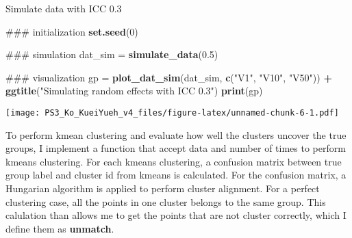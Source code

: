 \documentclass[]{article}
\newenvironment{Shaded}{\begin{snugshade}}{\end{snugshade}}
\newcommand{\KeywordTok}[1]{\textcolor[rgb]{0.13,0.29,0.53}{\textbf{#1}}}
\newcommand{\DecValTok}[1]{\textcolor[rgb]{0.00,0.00,0.81}{#1}}
\newcommand{\FloatTok}[1]{\textcolor[rgb]{0.00,0.00,0.81}{#1}}
\newcommand{\StringTok}[1]{\textcolor[rgb]{0.31,0.60,0.02}{#1}}
\newcommand{\OperatorTok}[1]{\textcolor[rgb]{0.81,0.36,0.00}{\textbf{#1}}}
\newcommand{\NormalTok}[1]{#1}
\begin{document}
Simulate data with ICC 0.3

\begin{Shaded}
\begin{Highlighting}[]
\NormalTok{### initialization}
\KeywordTok{set.seed}\NormalTok{(}\DecValTok{0}\NormalTok{)}

\NormalTok{### simulation}
\NormalTok{dat_sim =}\StringTok{ }\KeywordTok{simulate_data}\NormalTok{(}\FloatTok{0.5}\NormalTok{)}

\NormalTok{### visualization}
\NormalTok{gp =}\StringTok{ }\KeywordTok{plot_dat_sim}\NormalTok{(dat_sim, }\KeywordTok{c}\NormalTok{(}\StringTok{"V1"}\NormalTok{, }\StringTok{"V10"}\NormalTok{, }\StringTok{"V50"}\NormalTok{)) }\OperatorTok{+}
\StringTok{    }\KeywordTok{ggtitle}\NormalTok{(}\StringTok{"Simulating random effects with ICC 0.3"}\NormalTok{)}
\KeywordTok{print}\NormalTok{(gp)}
\end{Highlighting}
\end{Shaded}

\texttt{[image: PS3\_Ko\_KueiYueh\_v4\_files/figure-latex/unnamed-chunk-6-1.pdf]}

To perform kmean clustering and evaluate how well the clusters uncover
the true groups, I implement a function that accept data and number of
times to perform kmeans clustering. For each kmeans clustering, a
confusion matrix between true group label and cluster id from kmeans is
calculated. For the confusion matrix, a Hungarian algorithm is applied
to perform cluster alignment. For a perfect clustering case, all the
points in one cluster belongs to the same group. This calulation than
allows me to get the points that are not cluster correctly, which I
define them as \textbf{unmatch}.
\end{document}
